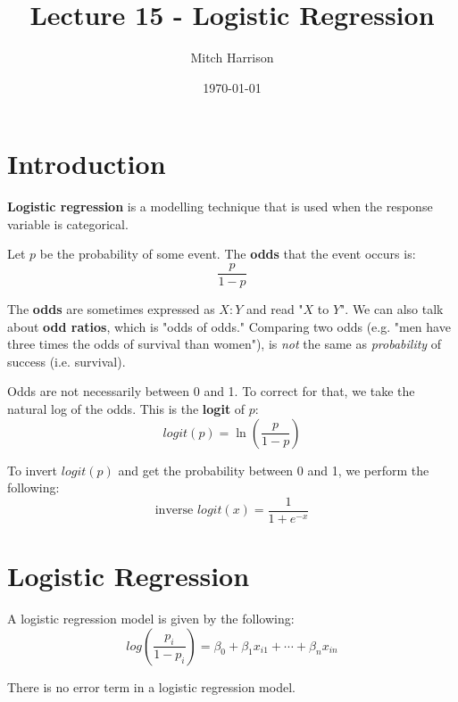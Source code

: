 \documentclass[titlepage, 12pt, leqno]{article}
\title{\Huge{Lecture 15 - Logistic Regression}}
\author{\large{Mitch Harrison}}
\date{\today}
\begin{document}
\setlength{\parskip}{1\baselineskip}
\setlength{\parindent}{15pt}
\maketitle
\tableofcontents
\newpage


\section{Introduction}

\begin{definition}
    \textbf{Logistic regression} is a modelling technique that is used when the
    response variable is categorical.
\end{definition}

\begin{definition}
    Let $p$ be the probability of some event. The \textbf{odds} that the event
    occurs is:
    \[
        \frac{p}{1-p}
    \]
\end{definition}

The \textbf{odds} are sometimes expressed as $X:Y$ and read "$X$ to $Y$". We
can also talk about \textbf{odd ratios}, which is "odds of odds." Comparing two
odds (e.g. "men have three times the odds of survival than women"), is 
\textit{not} the same as \textit{probability} of success (i.e. survival).

\begin{definition}
    Odds are not necessarily between 0 and 1. To correct for that, we take the
    natural log of the odds. This is the \textbf{logit} of $p$:
    \[
        logit(p) = \ln\left(\frac{p}{1-p}\right)
    \]
\end{definition}

To invert $logit(p)$ and get the probability between 0 and 1, we perform the 
following:
\[
    \text{inverse } logit(x) = \frac{1}{1+e^{-x}}
\]
\pagebreak
\section{Logistic Regression}
A logistic regression model is given by the following:
\[
    log\left(\frac{p_i}{1-p_i}\right) = \beta_0 + \beta_1x_{i1} + \cdots + 
    \beta_nx_{in}
\]
\begin{note}
    There is no error term in a logistic regression model.
\end{note}
\end{document}

